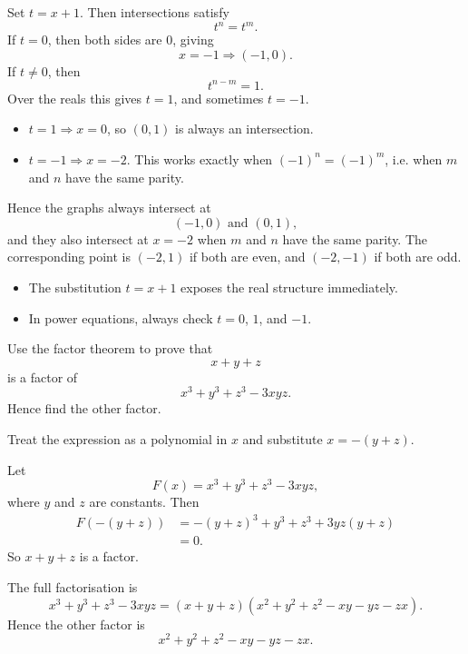 \begin{solution}
Set $t=x+1$. Then intersections satisfy
\[
t^n=t^m.
\]
If $t=0$, then both sides are $0$, giving
\[
x=-1 \Rightarrow (-1,0).
\]
If $t\ne 0$, then
\[
t^{n-m}=1.
\]
Over the reals this gives $t=1$, and sometimes $t=-1$.

\begin{itemize}[leftmargin=*]
\item $t=1 \Rightarrow x=0$, so $(0,1)$ is always an intersection.
\item $t=-1 \Rightarrow x=-2$. This works exactly when $(-1)^n=(-1)^m$, i.e. when $m$ and $n$ have the same parity.
\end{itemize}

Hence the graphs always intersect at
\[
\boxed{(-1,0)\text{ and }(0,1),}
\]
and they also intersect at $x=-2$ when $m$ and $n$ have the same parity. The corresponding point is $(-2,1)$ if both are even, and $(-2,-1)$ if both are odd.
\end{solution}

\begin{takeaways}
\begin{itemize}[leftmargin=*]
\item The substitution $t=x+1$ exposes the real structure immediately.
\item In power equations, always check $t=0$, $1$, and $-1$.
\end{itemize}
\end{takeaways}

\begin{problem}
Use the factor theorem to prove that
\[
x+y+z
\]
is a factor of
\[
x^3+y^3+z^3-3xyz.
\]
Hence find the other factor.
\end{problem}

\begin{hintbox}
Treat the expression as a polynomial in $x$ and substitute $x=-(y+z)$.
\end{hintbox}

\begin{solution}
Let
\[
F(x)=x^3+y^3+z^3-3xyz,
\]
where $y$ and $z$ are constants. Then
\begin{align*}
F(-(y+z))
&=-(y+z)^3+y^3+z^3+3yz(y+z)\\
&=0.
\end{align*}
So $x+y+z$ is a factor.

The full factorisation is
\[
x^3+y^3+z^3-3xyz=(x+y+z)(x^2+y^2+z^2-xy-yz-zx).
\]
Hence the other factor is
\[
\boxed{x^2+y^2+z^2-xy-yz-zx.}
\]
\end{solution}

